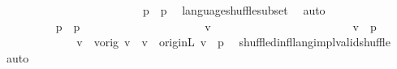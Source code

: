 \begin{isabellebody}
\ \ \ \ \ \ \isamarkupfalse%
\isanewline
\ \ \ \ \ \ \ \ \isanewline
\ \ \ \ \ \ \ \ \isamarkupfalse%
\ {\isachardoublequoteopen}{\isasymL}\isactrlsup {\isacharasterisk}{\kern0pt}{\isacharparenleft}{\kern0pt}p{\isacharparenright}{\kern0pt}\ {\isasymsubseteq}\ {\isasymL}\isactrlsup {\isacharasterisk}{\kern0pt}\isactrlsub {\isasymsqunion}\isactrlsub {\isasymsqunion}{\isacharparenleft}{\kern0pt}p{\isacharparenright}{\kern0pt}{\isachardoublequoteclose}\ \isamarkupfalse%
\ language{\isacharunderscore}{\kern0pt}shuffle{\isacharunderscore}{\kern0pt}subset\ \isamarkupfalse%
\ auto\isanewline
\ \ \ \ \ \ \ \ \ \ \ \ \isanewline
\ \ \ \ \ \ \ \ \isamarkupfalse%
\ {\isachardoublequoteopen}{\isasymL}\isactrlsup {\isacharasterisk}{\kern0pt}\isactrlsub {\isasymsqunion}\isactrlsub {\isasymsqunion}{\isacharparenleft}{\kern0pt}p{\isacharparenright}{\kern0pt}\ {\isasymsubseteq}\ {\isasymL}\isactrlsup {\isacharasterisk}{\kern0pt}{\isacharparenleft}{\kern0pt}p{\isacharparenright}{\kern0pt}{\isachardoublequoteclose}\ \isanewline
\ \ \ \ \ \ \ \ \isamarkupfalse%
\isanewline
\ \ \ \ \ \ \ \ \ \ \isamarkupfalse%
\ v{\isacharprime}{\kern0pt}\isanewline
\ \ \ \ \ \ \ \ \ \ \ \ \isanewline
\ \ \ \ \ \ \ \ \ \ \isamarkupfalse%
\ {\isachardoublequoteopen}v{\isacharprime}{\kern0pt}\ {\isasymin}\ {\isasymL}\isactrlsup {\isacharasterisk}{\kern0pt}\isactrlsub {\isasymsqunion}\isactrlsub {\isasymsqunion}{\isacharparenleft}{\kern0pt}p{\isacharparenright}{\kern0pt}{\isachardoublequoteclose}\isanewline
\ \ \ \ \ \ \ \ \ \ \isamarkupfalse%
\ \isamarkupfalse%
\ v\ \ v{\isacharunderscore}{\kern0pt}orig{\isacharcolon}{\kern0pt}\ {\isachardoublequoteopen}v{\isacharprime}{\kern0pt}\ {\isasymsqunion}{\isasymsqunion}\isactrlsub {\isacharquery}{\kern0pt}\ v{\isachardoublequoteclose}\ \ orig{\isacharunderscore}{\kern0pt}in{\isacharunderscore}{\kern0pt}L{\isacharcolon}{\kern0pt}\ {\isachardoublequoteopen}v\ {\isasymin}\ {\isasymL}\isactrlsup {\isacharasterisk}{\kern0pt}{\isacharparenleft}{\kern0pt}p{\isacharparenright}{\kern0pt}{\isachardoublequoteclose}\ \isamarkupfalse%
\ shuffled{\isacharunderscore}{\kern0pt}infl{\isacharunderscore}{\kern0pt}lang{\isacharunderscore}{\kern0pt}impl{\isacharunderscore}{\kern0pt}valid{\isacharunderscore}{\kern0pt}shuffle\ \isamarkupfalse%
\ auto\isanewline
\ \ \ \ \ \ \ \ \ \ \isamarkupfalse%

\end{isabellebody}

